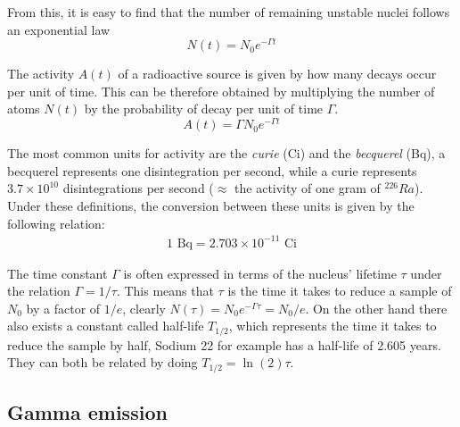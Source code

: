 From this, it is easy to find that the number of remaining unstable nuclei follows an exponential law
\begin{equation}
    N(t) = N_0 e^{-\Gamma t}
\end{equation}

The activity $A(t)$ of a radioactive source is given by how many decays occur per unit of time. This can be therefore obtained by multiplying the number of atoms $N(t)$ by the probability of decay per unit of time $\Gamma$.
\begin{equation}
    A(t) = \Gamma N_0 e^{-\Gamma t}
\end{equation}

The most common units for activity are the \textit{curie} (Ci) and the \textit{becquerel} (Bq), a becquerel represents one disintegration per second, while a curie represents $3.7\times10^{10}$ disintegrations per second ($\approx$ the activity of one gram of $^{226}Ra$). Under these definitions, the conversion between these units is given by the following relation:
\begin{eqnarray}
    1 \text{~Bq} = 2.703\times10^{-11} \text{~Ci}
\end{eqnarray}

The time constant $\Gamma$ is often expressed in terms of the nucleus' lifetime $\tau$ under the relation $\Gamma=1/\tau$. This means that $\tau$ is the time it takes to reduce a sample of $N_0$ by a factor of $1/e$, clearly $N(\tau)=N_0e^{-\Gamma \tau} = N_0/e$. On the other hand there also exists a constant called half-life $T_{1/2}$, which represents the time it takes to reduce the sample by half, Sodium 22 for example has a half-life of 2.605 years. They can both be related by doing $T_{1/2} = \ln (2)\tau$.

\subsection{Gamma emission}

